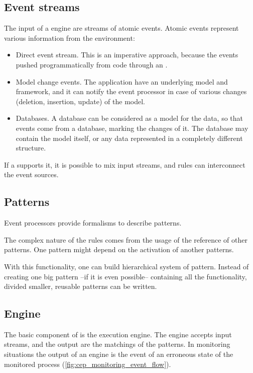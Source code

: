 \needspace{10em}
\subsection{Event streams}
\label{subsec:cep_eventstream}
\label{subsection:event_streams}
The input of a \cep{} engine are streams of atomic events. Atomic events represent various information from the environment:
\begin{itemize}
	\item Direct event stream. This is an imperative approach, because the events pushed programmatically from code through an .

	\item Model change events. The application have an underlying model and framework, and it can notify the event processor in case of various changes (deletion, insertion, update) of the model.\label{item:model}

	\item Databases. A database can be considered as a model for the data, so that events come from a database, marking the changes of it. The database may contain the model itself, or any data represented in a completely different structure.
\end{itemize}
\vspace{1ex}
If a \cep{} supports it, it is possible to mix input streams, and rules can interconnect the event sources.

\subsection{Patterns}
\label{subsec:cep_patterns}
Event processors provide formalisms to describe patterns.

The complex nature of the rules comes from the usage of the reference of other patterns. One pattern might depend on the activation of another patterns.

With this functionality, one can build hierarchical system of pattern. Instead of creating one big pattern --if it is even possible-- containing all the functionality, divided smaller, reusable patterns can be written.

\subsection{Engine}
\label{subsec:cep_engine}

The basic component of \cep{} is the execution engine. The engine accepts input streams, and the output are the matchings of the patterns. In monitoring situations the output of an engine is the event of an erroneous state of the monitored process (\cref{fig:cep_monitoring_event_flow}).

